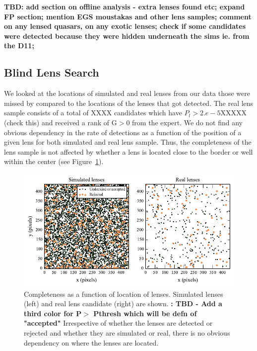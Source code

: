 \documentclass[useAMS,usenatbib,a4paper]{mn2e}
\begin{document}
{\bf TBD: 
add section on offline analysis - extra lenses found etc;  
expand FP section;  
mention EGS moustakas and other lens samples; 
comment on any lensed quasars, on any exotic lenses;
check if some candidates were detected because they were hidden
underneath the sims ie. from the D11;
}


\subsection{Blind Lens Search}
We looked at the locations of simulated and real lenses from our data
those were missed by \sw compared to the locations of the lenses that
got detected. The real lens sample consists of a total of XXXX candidates
which have $P_l>2.e-5$XXXXX (check this) and received a rank of G$>0$ from the
expert. We do not find any obvious dependency in the rate of detections
as a function of the position of a given lens for both simulated and
real lens sample. Thus, the completeness of the lens sample is not
affected by whether a lens is located close to the border or well within
the center (see  Figure~\ref{fig:comppos}).


\begin{figure}
\begin{center}
\includegraphics[scale=0.95]{sw-cfhtls-figs/completeness_pos.pdf}
\caption{ \label{fig:comppos}
Completeness as a function of location of lenses. Simulated lenses (left) and
real lens candidate (right) are shown. {\bf: TBD - Add a third color for
P$>$ Pthresh which will be defn of "accepted"} Irrespective of whether the
lenses are detected or rejected and whether they are simulated or real,
there is no obvious dependency on where the lenses are located. 
}
\end{center}
\end{figure}
\end{document}
